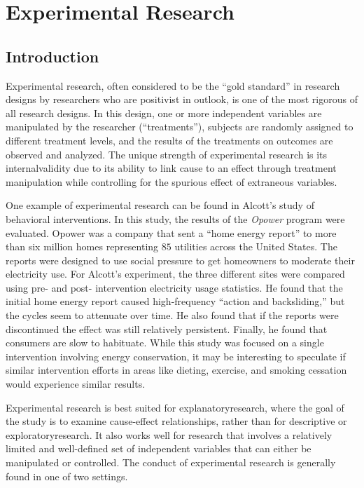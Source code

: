 \chapter{Experimental Research}\label{ch09:experimental_research}

\section{Introduction}

Experimental research, often considered to be the ``gold standard'' in research designs by researchers who are \gls{positivist} in outlook, is one of the most rigorous of all research designs. In this design, one or more independent variables are manipulated by the researcher (``treatments''), subjects are randomly assigned to different treatment levels, and the results of the treatments on outcomes are observed and analyzed. The unique strength of experimental research is its \gls{internalvalidity} due to its ability to link cause to an effect through treatment manipulation while controlling for the spurious effect of extraneous variables.

One example of experimental research can be found in Alcott's study of behavioral interventions\cite{allcott2014short}. In this study, the results of the \textit{Opower} program were evaluated. Opower was a company that sent a ``home energy report'' to more than six million homes representing $ 85 $ utilities across the United States. The reports were designed to use social pressure to get homeowners to moderate their electricity use. For Alcott's experiment, the three different sites were compared using pre- and post- intervention electricity usage statistics. He found that the initial home energy report caused high-frequency ``action and backsliding,'' but the cycles seem to attenuate over time. He also found that if the reports were discontinued the effect was still relatively persistent. Finally, he found that consumers are slow to habituate. While this study was focused on a single intervention involving energy conservation, it may be interesting to speculate if similar intervention efforts in areas like dieting, exercise, and smoking cessation would experience similar results.

Experimental research is best suited for \gls{explanatoryresearch}, where the goal of the study is to examine cause-effect relationships, rather than for descriptive or \gls{exploratoryresearch}. It also works well for research that involves a relatively limited and well-defined set of independent variables that can either be manipulated or controlled. The conduct of experimental research is generally found in one of two settings. 


